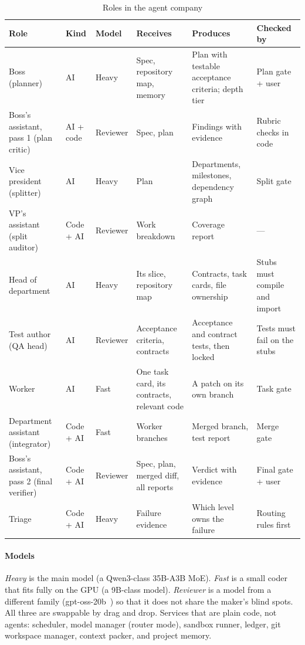 \begin{table}[t]
\caption{Roles in the agent company}
\label{tab:roles}
\centering\footnotesize
\begin{tabularx}{\textwidth}{@{}L{30mm}L{14mm}L{14mm}YYL{26mm}@{}}
\toprule
Role & Kind & Model & Receives & Produces & Checked by \\
\midrule
Boss (planner) & AI & Heavy & Spec, repository map, memory & Plan with testable acceptance criteria; depth tier & Plan gate + user \\
Boss's assistant, pass 1 (plan critic) & AI + code & Reviewer & Spec, plan & Findings with evidence & Rubric checks in code \\
Vice president (splitter) & AI & Heavy & Plan & Departments, milestones, dependency graph & Split gate \\
VP's assistant (split auditor) & Code + AI & Reviewer & Work breakdown & Coverage report & --- \\
Head of department & AI & Heavy & Its slice, repository map & Contracts, task cards, file ownership & Stubs must compile and import \\
Test author (QA head) & AI & Reviewer & Acceptance criteria, contracts & Acceptance and contract tests, then locked & Tests must fail on the stubs \\
Worker & AI & Fast & One task card, its contracts, relevant code & A patch on its own branch & Task gate \\
Department assistant (integrator) & Code + AI & Fast & Worker branches & Merged branch, test report & Merge gate \\
Boss's assistant, pass 2 (final verifier) & Code + AI & Reviewer & Spec, plan, merged diff, all reports & Verdict with evidence & Final gate + user \\
Triage & Code + AI & Heavy & Failure evidence & Which level owns the failure & Routing rules first \\
\bottomrule
\end{tabularx}
\end{table}

\paragraph{Models} \emph{Heavy} is the main model (a Qwen3-class 35B-A3B MoE). \emph{Fast} is a small coder that fits fully on the GPU (a 9B-class model). \emph{Reviewer} is a model from a different family (gpt-oss-20b~\cite{gptoss}) so that it does not share the maker's blind spots. All three are swappable by drag and drop. Services that are plain code, not agents: scheduler, model manager (router mode), sandbox runner, ledger, git workspace manager, context packer, and project memory.

